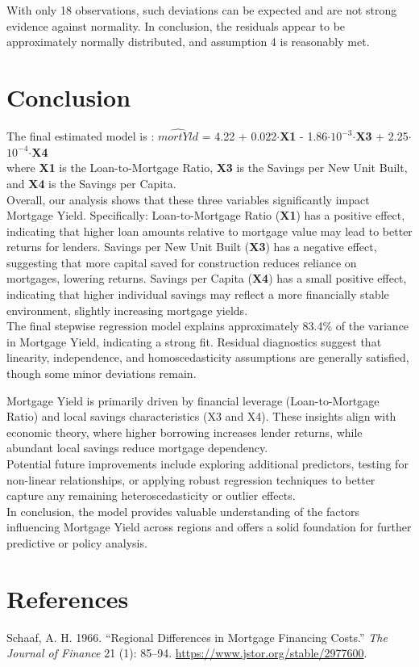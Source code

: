 \documentclass[
  12pt,
]{article}
\newlength{\cslhangindent}
\newenvironment{CSLReferences}[2] %
 {\begin{list}{}{%
  \setlength{\itemindent}{0pt}
  \setlength{\leftmargin}{0pt}
  \setlength{\parsep}{0pt}
  \ifodd #1
   \setlength{\leftmargin}{\cslhangindent}
   \setlength{\itemindent}{-1\cslhangindent}
  \fi
  \setlength{\itemsep}{#2\baselineskip}}}
 {\end{list}}
\begin{document}
With only 18 observations, such deviations can be expected and are not
strong evidence against normality. In conclusion, the residuals appear
to be approximately normally distributed, and assumption 4 is reasonably
met.

\section{Conclusion}\label{conclusion}

The final estimated model is : \(\hat{mortYld}\) = 4.22 +
0.022\(\cdot\)\textbf{X1} - 1.86\(\cdot\)\(10^{-3}\)\(\cdot\)\textbf{X3}
+ 2.25\(\cdot\)\(10^{-4}\)\(\cdot\)\textbf{X4}\\
where \textbf{X1} is the Loan-to-Mortgage Ratio, \textbf{X3} is the
Savings per New Unit Built, and \textbf{X4} is the Savings per Capita.\\
Overall, our analysis shows that these three variables significantly
impact Mortgage Yield. Specifically: Loan-to-Mortgage Ratio
(\textbf{X1}) has a positive effect, indicating that higher loan amounts
relative to mortgage value may lead to better returns for lenders.
Savings per New Unit Built (\textbf{X3}) has a negative effect,
suggesting that more capital saved for construction reduces reliance on
mortgages, lowering returns. Savings per Capita (\textbf{X4}) has a
small positive effect, indicating that higher individual savings may
reflect a more financially stable environment, slightly increasing
mortgage yields.\\
The final stepwise regression model explains approximately 83.4\% of the
variance in Mortgage Yield, indicating a strong fit. Residual
diagnostics suggest that linearity, independence, and homoscedasticity
assumptions are generally satisfied, though some minor deviations
remain.

Mortgage Yield is primarily driven by financial leverage
(Loan-to-Mortgage Ratio) and local savings characteristics (X3 and X4).
These insights align with economic theory, where higher borrowing
increases lender returns, while abundant local savings reduce mortgage
dependency.\\
Potential future improvements include exploring additional predictors,
testing for non-linear relationships, or applying robust regression
techniques to better capture any remaining heteroscedasticity or outlier
effects.\\
In conclusion, the model provides valuable understanding of the factors
influencing Mortgage Yield across regions and offers a solid foundation
for further predictive or policy analysis.

\section*{References}\label{references}

\label{refs}
\begin{CSLReferences}{1}{0}
Schaaf, A. H. 1966. {``Regional Differences in Mortgage Financing
Costs.''} \emph{The Journal of Finance} 21 (1): 85--94.
\url{https://www.jstor.org/stable/2977600}.

\end{CSLReferences}
\end{document}
